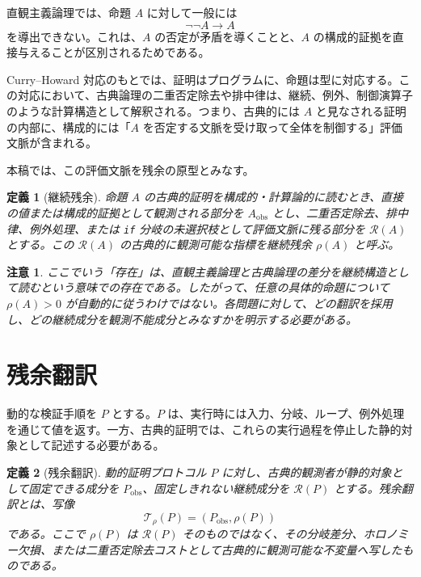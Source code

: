 \documentclass[11pt,a4paper,ja=standard,autodetect-engine]{bxjsarticle}
\newtheorem{definition}{定義}
\newtheorem{remark}{注意}
\begin{document}
直観主義論理では、命題 $A$ に対して一般には
\begin{equation}
    \neg\neg A \to A
\end{equation}
を導出できない。これは、$A$ の否定が矛盾を導くことと、$A$ の構成的証拠を直接与えることが区別されるためである。

Curry\mbox{--}Howard 対応のもとでは、証明はプログラムに、命題は型に対応する。この対応において、古典論理の二重否定除去や排中律は、継続、例外、制御演算子のような計算構造として解釈される。つまり、古典的には $A$ と見なされる証明の内部に、構成的には「$A$ を否定する文脈を受け取って全体を制御する」評価文脈が含まれる。

本稿では、この評価文脈を残余の原型とみなす。

\begin{definition}[継続残余]
命題 $A$ の古典的証明を構成的・計算論的に読むとき、直接の値または構成的証拠として観測される部分を $A_{\mathrm{obs}}$ とし、二重否定除去、排中律、例外処理、または \texttt{if} 分岐の未選択枝として評価文脈に残る部分を $\mathcal{R}(A)$ とする。この $\mathcal{R}(A)$ の古典的に観測可能な指標を継続残余 $\rho(A)$ と呼ぶ。
\end{definition}

\begin{remark}
ここでいう「存在」は、直観主義論理と古典論理の差分を継続構造として読むという意味での存在である。したがって、任意の具体的命題について $\rho(A)>0$ が自動的に従うわけではない。各問題に対して、どの翻訳を採用し、どの継続成分を観測不能成分とみなすかを明示する必要がある。
\end{remark}

\section{残余翻訳}

動的な検証手順を $P$ とする。$P$ は、実行時には入力、分岐、ループ、例外処理を通じて値を返す。一方、古典的証明では、これらの実行過程を停止した静的対象として記述する必要がある。

\begin{definition}[残余翻訳]
動的証明プロトコル $P$ に対し、古典的観測者が静的対象として固定できる成分を $P_{\mathrm{obs}}$、固定しきれない継続成分を $\mathcal{R}(P)$ とする。残余翻訳とは、写像
\begin{equation}
    \mathcal{T}_{\rho}(P)=(P_{\mathrm{obs}},\rho(P))
\end{equation}
である。ここで $\rho(P)$ は $\mathcal{R}(P)$ そのものではなく、その分岐差分、ホロノミー欠損、または二重否定除去コストとして古典的に観測可能な不変量へ写したものである。
\end{definition}
\end{document}
